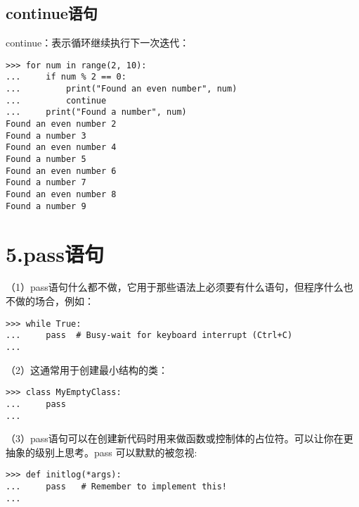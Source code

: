 \documentclass{article}
\begin{document}
\begin{CJK}{UTF8}{gbsn}
\subsection*{continue语句}
continue：表示循环继续执行下一次迭代：
\begin{verbatim}
>>> for num in range(2, 10):
...     if num % 2 == 0:
...         print("Found an even number", num)
...         continue
...     print("Found a number", num)
Found an even number 2
Found a number 3
Found an even number 4
Found a number 5
Found an even number 6
Found a number 7
Found an even number 8
Found a number 9
\end{verbatim}
\section*{5.pass语句}
（1）pass语句什么都不做，它用于那些语法上必须要有什么语句，但程序什么也不做的场合，例如：
\begin{verbatim}
>>> while True:
...     pass  # Busy-wait for keyboard interrupt (Ctrl+C)
...
\end{verbatim}
（2）这通常用于创建最小结构的类：
\begin{verbatim}
>>> class MyEmptyClass:
...     pass
...

\end{verbatim}
（3）pass语句可以在创建新代码时用来做函数或控制体的占位符。可以让你在更抽象的级别上思考。pass 可以默默的被忽视:
\begin{verbatim}
>>> def initlog(*args):
...     pass   # Remember to implement this!
...
\end{verbatim}

\end{CJK}
\end{document}
